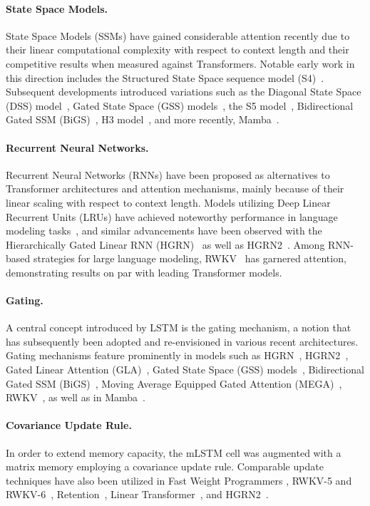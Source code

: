\paragraph{State Space Models.} State Space Models (SSMs) have gained considerable attention recently due to their linear computational complexity with respect to context length and their competitive results when measured against Transformers. Notable early work in this direction includes the Structured State Space sequence model (S4)~\citep{Gu:21}. Subsequent developments introduced variations such as the Diagonal State Space (DSS) model~\citep{Gupta:22}, Gated State Space (GSS) models~\citep{Mehta:22}, the S5 model~\citep{Smith:22}, Bidirectional Gated SSM (BiGS)~\citep{Wang:22}, H3 model~\citep{Fu:23}, and more recently, Mamba~\citep{Gu:24arxiv}.

\paragraph{Recurrent Neural Networks.} Recurrent Neural Networks (RNNs) have been proposed as alternatives to Transformer architectures and attention mechanisms, mainly because of their linear scaling with respect to context length. Models utilizing Deep Linear Recurrent Units (LRUs) have achieved noteworthy performance in language modeling tasks~\citep{Orvieto:23, De:24arxiv}, and similar advancements have been observed with the Hierarchically Gated Linear RNN (HGRN)~\citep{Qin:23} as well as HGRN2~\citep{Qin:24arxiv}. Among RNN-based strategies for large language modeling, RWKV~\citep{Peng:23arxivshort,Peng:24arxivshort} has garnered attention, demonstrating results on par with leading Transformer models.

\paragraph{Gating.}
A central concept introduced by LSTM is the gating mechanism, a notion that has subsequently been adopted and re-envisioned in various recent architectures. Gating mechanisms feature prominently in models such as HGRN~\citep{Qin:23}, HGRN2~\citep{Qin:24arxiv}, Gated Linear Attention (GLA)~\citep{Yang:23arxiv}, Gated State Space (GSS) models~\citep{Mehta:22}, Bidirectional Gated SSM (BiGS)~\citep{Wang:22}, Moving Average Equipped Gated Attention (MEGA)~\citep{Ma:22}, RWKV~\citep{Peng:23arxivshort}, as well as in Mamba~\citep{Gu:24arxiv}.

\paragraph{Covariance Update Rule.} In order to extend memory capacity, the mLSTM cell was augmented with a matrix memory employing a covariance update rule. Comparable update techniques have also been utilized in Fast Weight Programmers \citep{Schmidhuber:92ncfastweights,Schlag:21}, RWKV-5 and RWKV-6~\citep{Peng:24arxivshort}, Retention~\citep{Sun:23arxiv}, Linear Transformer~\citep{Katharopoulos:20}, and HGRN2~\citep{Qin:24arxiv}.

